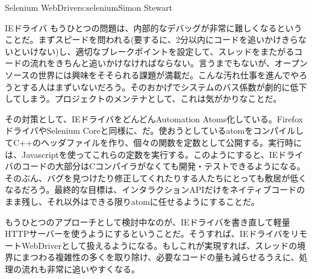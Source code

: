 \begin{aosachapter}{Selenium WebDriver}{s:selenium}{Simon Stewart}
\begin{aosasect1}{IEドライバ}
もうひとつの問題は、内部的なデバッグが非常に難しくなるということだ。まずスピードを問われる(要するに、2分以内にコードを追いかけきらないといけない)し、適切なブレークポイントを設定して、スレッドをまたがるコードの流れをきちんと追いかけなければならない。言うまでもないが、オープンソースの世界には興味をそそられる課題が満載だ。こんな汚れ仕事を進んでやろうとする人はまずいないだろう。そのおかげでシステムのバス係数が劇的に低下してしまう。プロジェクトのメンテナとして、これは気がかりなことだ。

その対策として、IEドライバをどんどんAutomation Atoms化している。FirefoxドライバやSelenium Coreと同様に、だ。使おうとしているatomをコンパイルしてC++のヘッダファイルを作り、個々の関数を定数として公開する。実行時には、Javascriptを使ってこれらの定数を実行する。このようにすると、IEドライバのコードの大部分はCコンパイラがなくても開発・テストできるようになる。そのぶん、バグを見つけたり修正してくれたりする人たちにとっても敷居が低くなるだろう。最終的な目標は、インタラクションAPIだけをネイティブコードのまま残し、それ以外はできる限りatomに任せるようにすることだ。

もうひとつのアプローチとして検討中なのが、IEドライバを書き直して軽量HTTPサーバーを使うようにするということだ。そうすれば、IEドライバをリモートWebDriverとして扱えるようになる。もしこれが実現すれば、スレッドの境界にまつわる複雑性の多くを取り除け、必要なコードの量も減らせるうえに、処理の流れも非常に追いやすくなる。


\end{aosasect1}
\end{aosachapter}

